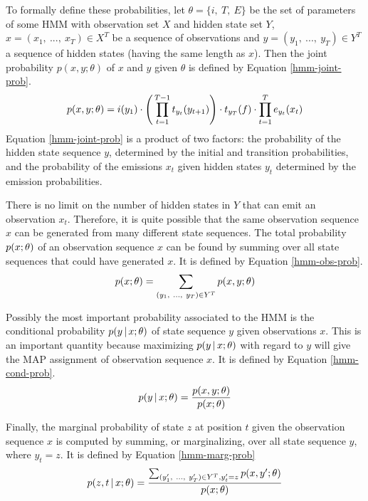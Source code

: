 To formally define these probabilities, let $\theta = \{i,\ T,\ E\}$ be
the set of parameters of some HMM with observation set $X$ and hidden
state set $Y$, $x = (x_1,\ ...,\ x_T) \in X^T$ be a sequence of
observations and $y = (y_1,\ ...,\ y_T) \in Y^T$ a sequence of hidden
states (having the same length as $x$). Then the joint probability
$p(x,y;\theta)$ of $x$ and $y$ given $\theta$ is defined by Equation
\eqref{hmm-joint-prob}.
\begin{equation}
p(x,y\mbox{$ ; \, $}\theta) = i(y_1) \cdot \Bigg( \prod_{t = 1}^{T-1} t_{y_t}(y_{t + 1})\Bigg) \cdot t_{y_T}(f) \cdot \prod_{t = 1}^T e_{y_t}(x_t)\label{hmm-joint-prob}
\end{equation}
Equation \eqref{hmm-joint-prob} is a product of two factors: the
probability of the hidden state sequence $y$, determined by the
initial and transition probabilities, and the probability of the
emissions $x_t$ given hidden states $y_t$ determined by the emission
probabilities.

There is no limit on the number of hidden states in $Y$ that can emit
an observation $x_t$. Therefore, it is quite possible that the same
observation sequence $x$ can be generated from many different state
sequences. The total probability $p(x\mbox{$ ; \, $}\theta)$ of an observation
sequence $x$ can be found by summing over all state sequences that
could have generated $x$. It is defined by Equation
\eqref{hmm-obs-prob}.
\begin{equation}
p(x\mbox{$ ; \, $}\theta) = \sum_{(y_1,\ ...,\ y_T) \in Y^T} p(x, y\mbox{$ ; \, $} \theta)\label{hmm-obs-prob}
\end{equation}

Possibly the most important probability associated to the HMM is the
conditional probability $p(y\mbox{$ \, | \, $} x\mbox{$ ; \, $}\theta)$ of state sequence $y$
given observations $x$. This is an important quantity because
maximizing $p(y\mbox{$ \, | \, $} x\mbox{$ ; \, $}\theta)$ with regard to $y$ will give the MAP
assignment of observation sequence $x$. It is defined by Equation
\eqref{hmm-cond-prob}.
\begin{equation}
p(y\mbox{$ \, | \, $} x\mbox{$ ; \, $}\theta) = \frac{p(x,y\mbox{$ ; \, $}\theta)}{p(x\mbox{$ ; \, $}\theta)}\label{hmm-cond-prob}
\end{equation}

Finally, the marginal probability of state $z$ at position $t$ given
the observation sequence $x$ is computed by summing, or marginalizing,
over all state sequence $y$, where $y_t = z$. It is defined by
Equation \eqref{hmm-marg-prob}
\begin{equation}
p(z, t\mbox{$ \, | \, $} x\mbox{$ ; \, $} \theta) = \frac{\sum_{(y'_1,\ ...,\ y'_T) \in Y^T, y'_t = z} p(x, y'\mbox{$ ; \, $} \theta)}{p(x\mbox{$ ; \, $}\theta)}\label{hmm-marg-prob}
\end{equation}

